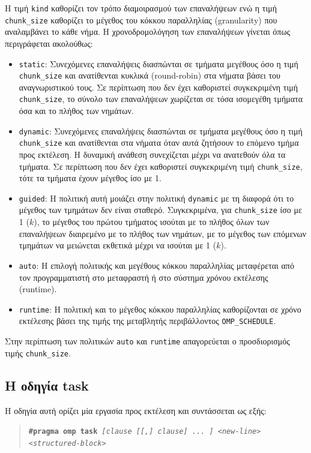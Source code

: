 Η τιμή \texttt{kind} καθορίζει τον τρόπο διαμοιρασμού των επαναλήψεων ενώ η τιμή \texttt{chunk\_size} καθορίζει το μέγεθος του κόκκου παραλληλίας (granularity) που αναλαμβάνει το κάθε νήμα. Η χρονοδρομολόγηση των επαναλήψεων γίνεται όπως περιγράφεται ακολούθως:
\begin{itemize}
	\item \texttt{static}: Συνεχόμενες επαναλήψεις διασπώνται σε τμήματα μεγέθους όσο η τιμή \texttt{chunk\_size} και ανατίθενται κυκλικά (round-robin) στα νήματα βάσει του αναγνωριστικού τους. Σε περίπτωση που δεν έχει καθοριστεί συγκεκριμένη τιμή \texttt{chunk\_size}, το σύνολο των επαναλήψεων χωρίζεται σε τόσα ισομεγέθη τμήματα όσα και το πλήθος των νημάτων.
	\item \texttt{dynamic}: Συνεχόμενες επαναλήψεις διασπώνται σε τμήματα μεγέθους όσο η τιμή \texttt{chunk\_size} και ανατίθενται στα νήματα όταν αυτά ζητήσουν το επόμενο τμήμα προς εκτέλεση. Η δυναμική ανάθεση συνεχίζεται μέχρι να ανατεθούν όλα τα τμήματα. Σε περίπτωση που δεν έχει καθοριστεί συγκεκριμένη τιμή \texttt{chunk\_size}, τότε τα τμήματα έχουν μέγεθος ίσο με 1.
	\item \texttt{guided}: Η πολιτική αυτή μοιάζει στην πολιτική \texttt{dynamic} με τη διαφορά ότι το μέγεθος των τμημάτων δεν είναι σταθερό. Συγκεκριμένα, για \texttt{chunk\_size} ίσο με 1 ($k$), το μέγεθος του πρώτου τμήματος ισούται με το πλήθος όλων των επαναλήψεων διαιρεμένο με το πλήθος των νημάτων, με το μέγεθος των επόμενων τμημάτων να μειώνεται εκθετικά μέχρι να ισούται με 1 ($k$).
	\item \texttt{auto}: Η επιλογή πολιτικής και μεγέθους κόκκου παραλληλίας μεταφέρεται από τον προγραμματιστή στο μεταφραστή ή στο σύστημα χρόνου εκτέλεσης (runtime).
	\item \texttt{runtime}: Η πολιτική και το μέγεθος κόκκου παραλληλίας καθορίζονται σε χρόνο εκτέλεσης βάσει της τιμής της μεταβλητής περιβάλλοντος \texttt{OMP\_SCHEDULE}.
\end{itemize}

Στην περίπτωση των πολιτικών \texttt{auto} και \texttt{runtime} απαγορεύεται ο προσδιορισμός τιμής \texttt{chunk\_size}.

\subsection{Η οδηγία task}
Η οδηγία αυτή ορίζει μία εργασία προς εκτέλεση και συντάσσεται ως εξής:
\begin{quote}
	\texttt{\textbf{\#pragma omp task} \textit{[clause [[,] clause] ... ] <new-line>}} \\
		\texttt{\textit{<structured-block>}}
\end{quote}


